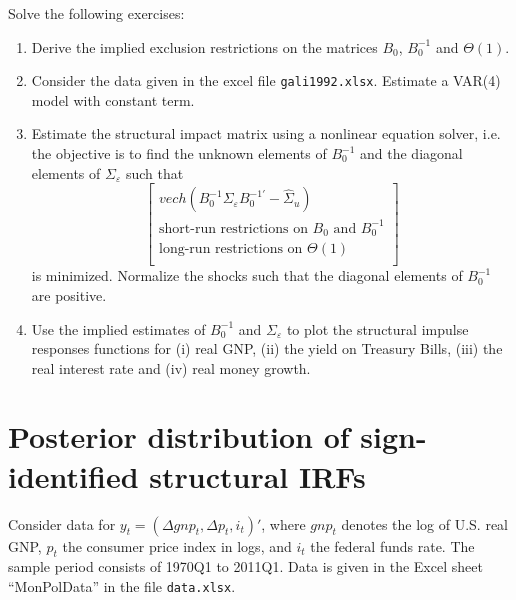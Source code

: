 \documentclass{article}
\begin{document}
Solve the following exercises:
\begin{enumerate}
	\item Derive the implied exclusion restrictions on the matrices $B_0$, $B_0^{-1}$ and $\Theta(1)$.
	\item Consider the data given in the excel file \texttt{gali1992.xlsx}. Estimate a VAR(4) model with constant term.
	\item Estimate the structural impact matrix using a nonlinear equation solver, i.e. the objective is to find the unknown elements of $B_0^{-1}$ and the diagonal elements of $\Sigma_\varepsilon$ such that
	$$\begin{bmatrix}
	vech(B_0^{-1} \Sigma_\varepsilon B_0^{-1'}-\hat{\Sigma}_u)\\
	\text{short-run restrictions on }B_0 \text{ and } B_0^{-1} \\
	\text{long-run restrictions on }\Theta(1)\\
	\end{bmatrix}$$
	is minimized. Normalize the shocks such that the diagonal elements of $B_0^{-1}$ are positive.
	\item Use the implied estimates of $B_0^{-1}$ and $\Sigma_\varepsilon$ to plot the structural impulse responses functions for (i) real GNP, (ii) the yield on Treasury Bills, (iii) the real interest rate and (iv) real money growth.
\end{enumerate}

\newpage

\section{Posterior distribution of sign-identified structural IRFs}
Consider data for $y_t = (\Delta gnp_t,\Delta p_t,i_t)'$, where $gnp_t$ denotes the log of U.S. real GNP, $p_t$ the consumer price index in logs, and $i_t$ the federal funds rate. The sample period consists of 1970Q1 to 2011Q1.  Data is given in the Excel sheet \enquote{MonPolData} in the file \texttt{data.xlsx}.
\end{document}
